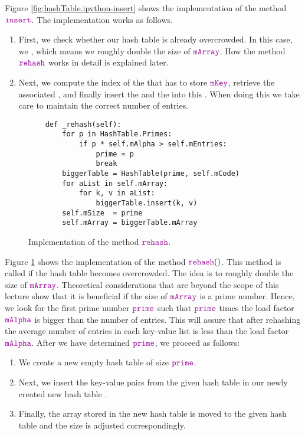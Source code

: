 Figure \ref{fig:hashTable.ipython-insert} shows the implementation of the method $\mytt{insert}$.
The implementation works as follows.
\begin{enumerate}
\item First, we check whether our hash table is already overcrowded.
      In this case, we , which means we roughly double the size of $\mytt{mArray}$.
      How the method $\mytt{rehash}$ works in detail is explained later.
\item Next, we compute the index of the  that has to store
      $\mytt{mKey}$, retrieve the associated , and finally insert the  and the
       into this .
      When doing this we take care to maintain the correct number of entries.
\end{enumerate}


\begin{figure}[!ht]
\centering
\begin{verbatim}
    def _rehash(self):
        for p in HashTable.Primes:
            if p * self.mAlpha > self.mEntries:
                prime = p
                break
        biggerTable = HashTable(prime, self.mCode)
        for aList in self.mArray:
            for k, v in aList:
                biggerTable.insert(k, v)
        self.mSize  = prime
        self.mArray = biggerTable.mArray
\end{verbatim}
\vspace*{-0.3cm}
\caption{Implementation of the method $\mytt{rehash}$.}
\label{fig:hashTable.ipython-rehash}
\end{figure}


Figure \ref{fig:hashTable.ipython-rehash} shows the implementation of the method
$\mytt{rehash}()$.  This method is called if the hash table becomes overcrowded.  The idea is to
roughly double the size of $\mytt{mArray}$.  Theoretical considerations that are  beyond the scope
of this lecture show that it is beneficial if the size of $\mytt{mArray}$ is a prime number.
Hence, we look for the first prime number $\mytt{prime}$ such that $\mytt{prime}$ times the load
factor $\mytt{mAlpha}$ is bigger than the
number of entries.  This will assure that after rehashing the average number of entries in each key-value
list is less than the load factor $\mytt{mAlpha}$.  After we have determined $\mytt{prime}$, we
proceed as follows: 
\begin{enumerate}
\item We create a new empty hash table of size $\mytt{prime}$.
\item Next, we insert the key-value pairs from the given hash table in our newly created new hash table
      .
\item Finally, the array stored in the new hash table is moved to the given hash table
      and the size is adjusted correspondingly.
\end{enumerate}


